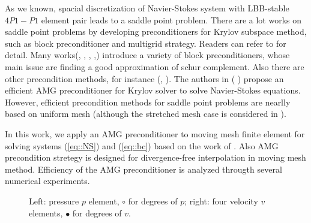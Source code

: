 \documentclass{eajam}
\begin{document}
    As we known, spacial discretization of Navier-Stokes system with
    LBB-stable $4P1-P1$ element pair leads to a saddle point problem.
    There are a lot works on saddle point problems by developing
    preconditioners for Krylov subspace method, such as block
    preconditioner and multigrid strategy. Readers can refer to
    \cite{benzi2005numerical} for detail. Many works(\cite{shen1999schur},
    \cite{bai2005inexact}, \cite{bai2006structured},
    \cite{elman2007least},\cite{elman2009boundary}) introduce a
    variety of block preconditioners, whose main issue are finding a
    good approximation of schur complement. Also there are other
    precondition methods, for instance (\cite{benzi2006augmented},
    \cite{benzi2011relaxed}). The authors in (\cite{boyle2007hsl}
    \cite{boyle2010hsl_mi20}) propose an efficient AMG preconditioner
    for Krylov solver to solve Navier-Stokes equations. However,
    efficient precondition methods for saddle point problems are nearlly
    based on uniform mesh (although the stretched mesh case is considered
    in \cite{benzi2011relaxed}).
    
    In this work, we apply an AMG preconditioner to moving mesh
    finite element for solving systems (\ref{eq::NS}) and
    (\ref{eq::bc}) based on the work of
    \cite{elman2005finite}. Also AMG precondition stretegy is designed
    for divergence-free interpolation in moving mesh
    method. Efficiency of the AMG preconditioner is analyzed througth
    several numerical experiments.

    \begin{figure}
      \centering    
      \caption{Left: pressure $p$ element, $\circ$ for degrees of $p$; 
               right: four velocity $v$ elements, $\bullet$ for degrees
               of $v$.}
      \label{fig::p-v}       
    \end{figure}
      
\end{document}
